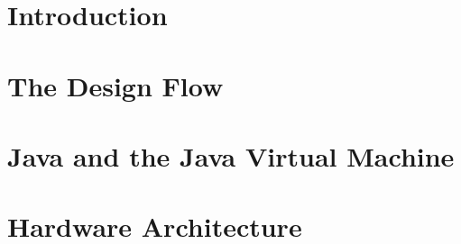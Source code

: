 



%





\frontmatter \pagestyle{empty}



\pagestyle{scrheadings}

\tableofcontents \cleardoublepage

\mainmatter


\chapter{Introduction}
\label{chap:intro}
    

\chapter{The Design Flow}
\label{chap:build}




\chapter{Java and the Java Virtual Machine}
\label{chap:java}


%
%    

\chapter{Hardware Architecture}
\label{chap:arch}

    

